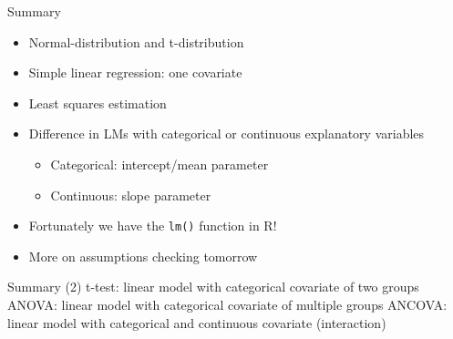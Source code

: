 \documentclass[
  ignorenonframetext,
]{beamer}
\providecommand{\tightlist}{%
  \setlength{\itemsep}{0pt}\setlength{\parskip}{0pt}}
\begin{document}
\begin{frame}[fragile]{Summary}
\protect\hypertarget{summary}{}
\begin{itemize}
\tightlist
\item
  Normal-distribution and t-distribution
\item
  Simple linear regression: one covariate
\item
  Least squares estimation
\item
  Difference in LMs with categorical or continuous explanatory variables

  \begin{itemize}
  \tightlist
  \item
    Categorical: intercept/mean parameter
  \item
    Continuous: slope parameter
  \end{itemize}
\item
  Fortunately we have the \texttt{lm()} function in R!
\item
  More on assumptions checking tomorrow
\end{itemize}
\end{frame}

\begin{frame}{Summary (2)}
\protect\hypertarget{summary-2}{}
t-test: linear model with categorical covariate of two groups ANOVA:
linear model with categorical covariate of multiple groups ANCOVA:
linear model with categorical and continuous covariate (interaction)
\end{frame}
\end{document}
